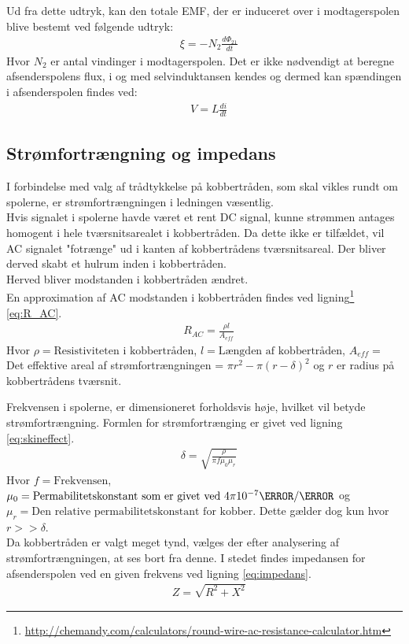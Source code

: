 Ud fra dette udtryk, kan den totale EMF, der er induceret over i modtagerspolen blive bestemt ved følgende udtryk:
\begin{align}
	&\xi = -N_2\frac{d\Phi_{21}}{dt} \label{eq:emf_lille_spole}
\end{align}
Hvor $N_2$ er antal vindinger i modtagerspolen.
Det er ikke nødvendigt at beregne afsenderspolens flux, i og med selvinduktansen kendes og dermed kan spændingen i afsenderspolen findes ved:
\begin{align}
	&V = L\frac{di}{dt} \label{eq:ldidt}
\end{align}
\subsection{Strømfortrængning  og impedans}\label{Sec_skineff.}
I forbindelse med valg af trådtykkelse på kobbertråden, som skal vikles rundt om spolerne, er strømfortrængningen i ledningen væsentlig.\\
Hvis signalet i spolerne havde været et rent DC signal, kunne strømmen antages homogent i hele tværsnitsarealet i kobbertråden.
Da dette ikke er tilfældet, vil AC signalet "fotrænge" ud i kanten af kobbertrådens tværsnitsareal. 
Der bliver derved skabt et hulrum inden i kobbertråden. \\
Herved bliver modstanden i kobbertråden ændret.\\
En approximation af AC modstanden i kobbertråden findes ved ligning\footnote{\url{http://chemandy.com/calculators/round-wire-ac-resistance-calculator.htm}} \ref{eq:R_AC}.
\begin{align}
	& R_{AC}=\frac{\rho l}{A_{eff}} \label{eq:R_AC}
\end{align}
Hvor $ \rho = \text{Resistiviteten i kobbertråden}$, $l = \text{Længden af kobbertråden}$, $A_{eff} =$ Det effektive areal af strømfortrængningen = $\pi r^2-\pi(r-\delta)^2$ og $r$ er radius på kobbertrådens tværsnit.

Frekvensen i spolerne, er dimensioneret forholdsvis høje, hvilket vil betyde strømfortrængning.
Formlen for strømfortrænging er givet ved ligning \ref{eq:skineffect}.
\begin{align}
	& \delta = \sqrt{\frac{\rho}{\pi f\mu_0\mu_r}} \label{eq:skineffect}
\end{align}
Hvor $f = \text{Frekvensen}$, $\mu_0 = \text{Permabilitetskonstant som er givet ved $4\pi 10^{-7}\henry/\meter$}$ og $\mu_r = \text{Den relative permabilitetskonstant for kobber}$.
Dette gælder dog kun hvor $r>>\delta$. \\
Da kobbertråden er valgt meget tynd, vælges der efter analysering af strømfortrængningen, at ses bort fra denne. 
I stedet findes impedansen for afsenderspolen ved en given frekvens ved ligning \ref{eq:impedans}.
\begin{align}
	& Z=\sqrt{R^2+X^2} \label{eq:impedans}
\end{align}


